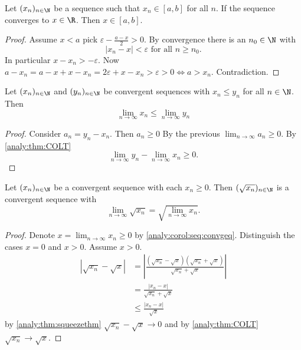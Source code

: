 \documentclass[10pt, a4paper]{article}
\newcommand{\seq}[1][x]{(#1_n)_{n \in \N}}
\begin{document}
\begin{theorem}\label{analy:thm:contofsqrt}
    Let $\seq$ be a sequence such that $x_n \in [a, b]$ for all $n$.
    If the sequence converges to $x \in \R$.
    Then $x \in [a, b]$.
    \begin{proof}
        Assume $x < a$ pick $\varepsilon - \frac{a - x}{2} > 0$.
        By convergence there is an $n_0 \in \N$ with
        \[
        |x_n - x| < \varepsilon \text{ for all } n \geq n_0.
        \]
        In particular
        $x - x_n > - \varepsilon$.
        Now $a - x_n = a - x + x - x_n = 2\varepsilon + x - x_n > \varepsilon > 0 \iff a > x_n$.
        Contradiction.
    \end{proof}
\end{theorem}

\begin{corollary}\label{analy:corol:seq:convgeq}
    Let $\seq$ and $\seq[y]$ be convergent sequences with $x_n \leq y_n$ for all $n \in \N$.
    Then
    \[
    \lim_{n \to \infty}x_n \leq \lim_{n \to \infty}y_n
    \]
    \begin{proof}
        Consider $a_n = y_n - x_n$.
        Then $a_n \geq 0$
        By the previous $\lim_{n \to \infty}a_n \geq 0$. By \autoref{analy:thm:COLT}
        \[
        \lim_{n \to \infty}y_n - \lim_{n \to \infty}x_n \geq 0.
        \]
    \end{proof}
\end{corollary}
\begin{theorem}
    Let $\seq$ be a convergent sequence with each $x_n \geq 0$.
    Then
    $(\sqrt{x_n})_{n \in \N}$ is a convergent sequence with
    \[
    \lim_{n \to \infty}\sqrt{x_n} = \sqrt{\lim_{n \to \infty}x_n}.
    \]
    \begin{proof}
        Denote $x = \lim_{n \to \infty}x_n \geq 0$ by \autoref{analy:corol:seq:convgeq}.
        Distinguish the cases $x = 0$ and $x > 0$.
        Assume $x > 0$.
        \begin{align*}
            |\sqrt{x_n} - \sqrt{x}| &= \left|\frac{(\sqrt{x_n} - \sqrt{x})(\sqrt{x_n} + \sqrt{x})}{\sqrt{x_n} + \sqrt{x}}\right| \\
            &= \frac{|x_n - x|}{\sqrt{x_n} + \sqrt{x}} \\
            &\leq \frac{|x_n - x|}{\sqrt{x}}
        \end{align*}
        by \autoref{analy:thm:squeezethm} $\sqrt{x_n} - \sqrt{x} \to 0$ and by \autoref{analy:thm:COLT} $\sqrt{x_n} \to \sqrt{x}$.
    \end{proof}
\end{theorem}
\end{document}

